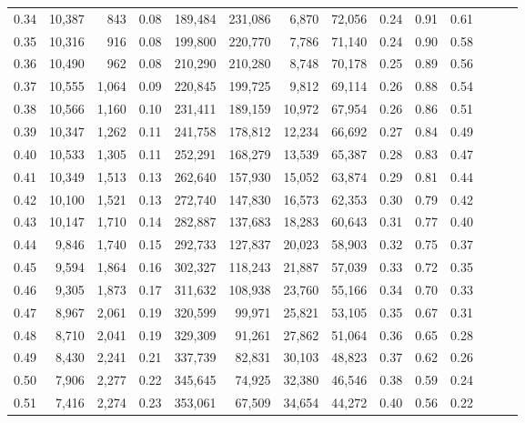 \begin{tabular}{rrrrrrrrrrrrrr}
0.34 &  10,387 &    843 &  0.08 &  189,484 &  231,086 &   6,870 &  72,056 &  0.24 &  0.91 &      0.61 \\
0.35 &  10,316 &    916 &  0.08 &  199,800 &  220,770 &   7,786 &  71,140 &  0.24 &  0.90 &      0.58 \\
0.36 &  10,490 &    962 &  0.08 &  210,290 &  210,280 &   8,748 &  70,178 &  0.25 &  0.89 &      0.56 \\
0.37 &  10,555 &  1,064 &  0.09 &  220,845 &  199,725 &   9,812 &  69,114 &  0.26 &  0.88 &      0.54 \\
0.38 &  10,566 &  1,160 &  0.10 &  231,411 &  189,159 &  10,972 &  67,954 &  0.26 &  0.86 &      0.51 \\
0.39 &  10,347 &  1,262 &  0.11 &  241,758 &  178,812 &  12,234 &  66,692 &  0.27 &  0.84 &      0.49 \\
0.40 &  10,533 &  1,305 &  0.11 &  252,291 &  168,279 &  13,539 &  65,387 &  0.28 &  0.83 &      0.47 \\
0.41 &  10,349 &  1,513 &  0.13 &  262,640 &  157,930 &  15,052 &  63,874 &  0.29 &  0.81 &      0.44 \\
0.42 &  10,100 &  1,521 &  0.13 &  272,740 &  147,830 &  16,573 &  62,353 &  0.30 &  0.79 &      0.42 \\
0.43 &  10,147 &  1,710 &  0.14 &  282,887 &  137,683 &  18,283 &  60,643 &  0.31 &  0.77 &      0.40 \\
0.44 &   9,846 &  1,740 &  0.15 &  292,733 &  127,837 &  20,023 &  58,903 &  0.32 &  0.75 &      0.37 \\
0.45 &   9,594 &  1,864 &  0.16 &  302,327 &  118,243 &  21,887 &  57,039 &  0.33 &  0.72 &      0.35 \\
0.46 &   9,305 &  1,873 &  0.17 &  311,632 &  108,938 &  23,760 &  55,166 &  0.34 &  0.70 &      0.33 \\
0.47 &   8,967 &  2,061 &  0.19 &  320,599 &   99,971 &  25,821 &  53,105 &  0.35 &  0.67 &      0.31 \\
0.48 &   8,710 &  2,041 &  0.19 &  329,309 &   91,261 &  27,862 &  51,064 &  0.36 &  0.65 &      0.28 \\
0.49 &   8,430 &  2,241 &  0.21 &  337,739 &   82,831 &  30,103 &  48,823 &  0.37 &  0.62 &      0.26 \\
0.50 &   7,906 &  2,277 &  0.22 &  345,645 &   74,925 &  32,380 &  46,546 &  0.38 &  0.59 &      0.24 \\
0.51 &   7,416 &  2,274 &  0.23 &  353,061 &   67,509 &  34,654 &  44,272 &  0.40 &  0.56 &      0.22 \\

\end{tabular}
